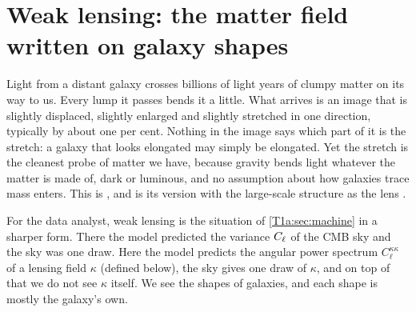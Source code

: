 \section{Weak lensing: the matter field written on galaxy shapes}
\label{T1b:sec:shapes}

Light from a distant galaxy crosses billions of light years of clumpy matter on its way to us. Every lump it passes bends it a little. What arrives is an image that is slightly displaced, slightly enlarged and slightly stretched in one direction, typically by about one per cent. Nothing in the image says which part of it is the stretch: a galaxy that looks elongated may simply be elongated. Yet the stretch is the cleanest probe of matter we have, because gravity bends light whatever the matter is made of, dark or luminous, and no assumption about how galaxies trace mass enters. This is , and  is its version with the large-scale structure as the lens \cite{BartelmannSchneider2001,Kilbinger2015}.

For the data analyst, weak lensing is the situation of \cref{T1a:sec:machine} in a sharper form. There the model predicted the variance $C_\ell$ of the CMB sky and the sky was one draw. Here the model predicts the angular power spectrum $C_\ell^{\kappa\kappa}$ of a lensing field $\kappa$ (defined below), the sky gives one draw of $\kappa$, and on top of that we do not see $\kappa$ itself. We see the shapes of galaxies, and each shape is mostly the galaxy's own.

